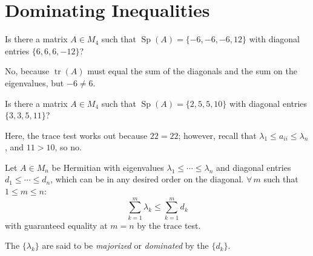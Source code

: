 \documentclass[letterpaper,12pt,fleqn]{article}
\renewcommand{\l}{\lambda}
\DeclareMathOperator{\Sp}{Sp}
\DeclareMathOperator{\tr}{tr}
\begin{document}
\section*{Dominating Inequalities}

\begin{example}
  Is there a matrix $A\in M_4$ such that $\Sp(A)=\{-6,-6,-6,12\}$ with
  diagonal entries $\{6,6,6,-12\}$?

  No, because $\tr(A)$ must equal the sum of the diagonals and the sum on the
  eigenvalues, but $-6\ne 6$.
\end{example}

\begin{example}
  Is there a matrix $A\in M_4$ such that $\Sp(A)=\{2,5,5,10\}$ with
  diagonal entries $\{3,3,5,11\}$?

  Here, the trace test works out because $22=22$; however, recall that
  $\l_1\le a_{ii}\le\l_n$, and $11>10$, so no.
\end{example}

\begin{theorem}
  Let $A\in M_n$ be Hermitian with eigenvalues $\l_1\le\cdots\le\l_n$ and
  diagonal entries $d_1\le\cdots\le d_n$, which can be in any desired order on
  the diagonal. $\forall\,m$ such that $1\le m\le n$:
  \[\sum_{k=1}^m\l_k\le\sum_{k=1}^md_k\]
  with guaranteed equality at $m=n$ by the trace test.
  
  The $\{\l_k\}$ are said to be \emph{majorized} or \emph{dominated} by the
  $\{d_k\}$.
\end{theorem}
\end{document}
